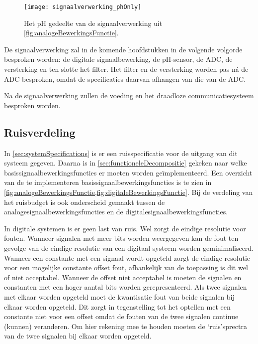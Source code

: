 \begin{figure}[!htb]
    \centering
    \texttt{[image: signaalverwerking\_phOnly]}
    \caption{Het pH gedeelte van de signaalverwerking uit \cref{fig:analogeBewerkingsFunctie}.}
    \label{fig:signaalverwerking_phOnly}
\end{figure}

De signaalverwerking zal in de komende hoofdstukken in de volgende volgorde besproken worden: de digitale signaalbewerking, de pH-sensor, de ADC, de versterking en ten slotte het filter. Het filter en de versterking worden pas n\'a %
de ADC besproken, omdat de specificaties daarvan afhangen van die van de ADC.

Na de signaalverwerking zullen de voeding en het draadloze communicatiesysteem besproken worden.

\subsection{Ruisverdeling}
In \cref{sec:systemSpecifications} is er een ruisspecificatie voor de uitgang van dit systeem gegeven. Daarna is in \cref{sec:functioneleDecompositie} gekeken naar welke basissignaalbewerkingsfuncties er moeten worden geïmplementeerd. Een overzicht van de te implementeren basissignaalbewerkingsfuncties is te zien in \cref{fig:analogeBewerkingsFunctie,fig:digitaleBewerkingsFunctie}. Bij de verdeling van het ruisbudget is ook onderscheid gemaakt tussen de analogesignaalbewerkingsfuncties en de digitalesignaalbewerkingsfuncties.

In digitale systemen is er geen last van ruis. Wel zorgt de eindige resolutie voor fouten. Wanneer signalen met meer bits worden weergegeven kan de fout ten gevolge van de eindige resolutie van een digitaal systeem worden geminimaliseerd. Wanneer een constante met een signaal wordt opgeteld zorgt de eindige resolutie voor een mogelijke constante offset fout, afhankelijk van de toepassing is dit wel of niet acceptabel. Wanneer de offset niet acceptabel is moeten de signalen en constanten met een hoger aantal bits worden gerepresenteerd. Als twee signalen met elkaar worden opgeteld moet de kwantisatie fout van beide signalen bij elkaar worden opgeteld. Dit zorgt in tegenstelling tot het optellen met een constante niet voor een offset omdat de fouten van de twee signalen continue (kunnen) veranderen. Om hier rekening mee te houden moeten de `ruis'sprectra van de twee signalen bij elkaar worden opgeteld.

